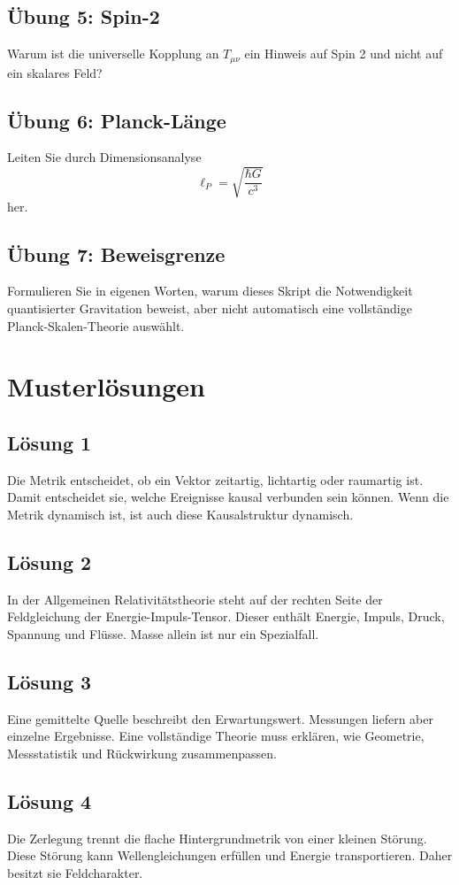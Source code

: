 \documentclass[11pt,a4paper,oneside]{book}
\theoremstyle{definition}
\theoremstyle{plain}
\theoremstyle{remark}
\begin{document}
\section*{Übung 5: Spin-2}
Warum ist die universelle Kopplung an $T_{\mu\nu}$ ein Hinweis auf Spin 2 und nicht auf ein skalares Feld?

\section*{Übung 6: Planck-Länge}
Leiten Sie durch Dimensionsanalyse
\[
\ell_P=\sqrt{\frac{\hbar G}{c^3}}
\]
her.

\section*{Übung 7: Beweisgrenze}
Formulieren Sie in eigenen Worten, warum dieses Skript die Notwendigkeit quantisierter Gravitation beweist, aber nicht automatisch eine vollständige Planck-Skalen-Theorie auswählt.

\chapter{Musterlösungen}
\section*{Lösung 1}
Die Metrik entscheidet, ob ein Vektor zeitartig, lichtartig oder raumartig ist. Damit entscheidet sie, welche Ereignisse kausal verbunden sein können. Wenn die Metrik dynamisch ist, ist auch diese Kausalstruktur dynamisch.

\section*{Lösung 2}
In der Allgemeinen Relativitätstheorie steht auf der rechten Seite der Feldgleichung der Energie-Impuls-Tensor. Dieser enthält Energie, Impuls, Druck, Spannung und Flüsse. Masse allein ist nur ein Spezialfall.

\section*{Lösung 3}
Eine gemittelte Quelle beschreibt den Erwartungswert. Messungen liefern aber einzelne Ergebnisse. Eine vollständige Theorie muss erklären, wie Geometrie, Messstatistik und Rückwirkung zusammenpassen.

\section*{Lösung 4}
Die Zerlegung trennt die flache Hintergrundmetrik von einer kleinen Störung. Diese Störung kann Wellengleichungen erfüllen und Energie transportieren. Daher besitzt sie Feldcharakter.
\end{document}
